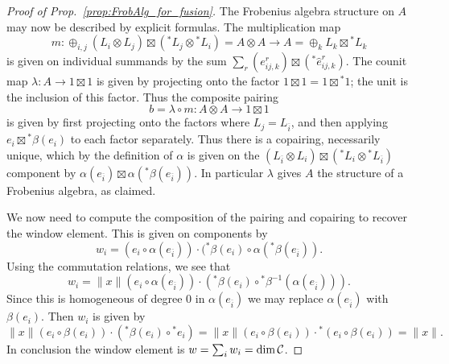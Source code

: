 \documentclass{amsart}
\begin{document}
\begin{proof}[Proof of Prop.~\ref{prop:FrobAlg_for_fusion}]
The Frobenius algebra structure on $A$ may now be described by explicit formulas. The multiplication map 
\begin{equation*}
	m: \oplus_{i,j} (L_i \otimes L_j) \boxtimes ({}^*L_j \otimes {}^*L_i) = A \otimes A \to A = \oplus_k L_k \boxtimes {}^*L_k
\end{equation*}
is given on individual summands by the sum $\sum_r (e_{ij,k}^r) \boxtimes ({}^*\hat{e}_{ij, k}^r)$. The counit map $\lambda: A \to 1 \boxtimes 1$ is given by projecting onto the factor $1 \boxtimes 1 = 1 \boxtimes {}^*1$; the unit is the inclusion of this factor. Thus the composite pairing 
\begin{equation*}
	b=\lambda \circ m: A \otimes A \to 1 \boxtimes 1
\end{equation*}
 is given by first projecting onto the factors where $L_j = L_{\overline{i}}$, and then applying $e_i \boxtimes {}^*\beta(e_i)$ to each factor separately. Thus there is a copairing, necessarily unique, which by the definition of $\alpha$ is given on the $(L_{\overline{i}} \otimes L_i) \boxtimes ({}^*L_i \otimes {}^*L_{\overline{i}})$ component by $\alpha(e_{\overline{i}}) \boxtimes \alpha({}^*\beta(e_{\overline{i}}))$. In particular $\lambda$ gives $A$ the structure of a Frobenius algebra, as claimed. 
  
We now need to compute the composition of the pairing and copairing to recover the window element.  This is given on components by 
$$w_i = (e_i \circ \alpha(e_{\overline{i}})) \cdot ({}^*\beta(e_i) \circ \alpha ({}^*\beta(e_{\overline{i}})).$$  
Using the commutation relations, we see that $$w_i = \lVert x \rVert (e_i \circ \alpha(e_{\overline{i}})) \cdot ({}^*\beta(e_i) \circ {}^*\beta^{-1} (\alpha(e_{\overline{i}}))).$$ Since this is homogeneous of degree $0$ in $\alpha(e_{\overline{i}})$ we may replace $\alpha(e_{\overline{i}})$ with $\beta(e_i)$.  Then $w_i$ is given by $$\lVert x \rVert (e_i \circ \beta(e_i)) \cdot ({}^*\beta(e_i) \circ {}^*e_i) = \lVert x \rVert (e_i \circ \beta(e_i)) \cdot {}^*(e_i \circ \beta(e_i)) = \lVert x \rVert.$$  In conclusion the window element is $w = \sum_i w_i = \dim \mathcal C$.

\end{proof}

\end{document}
